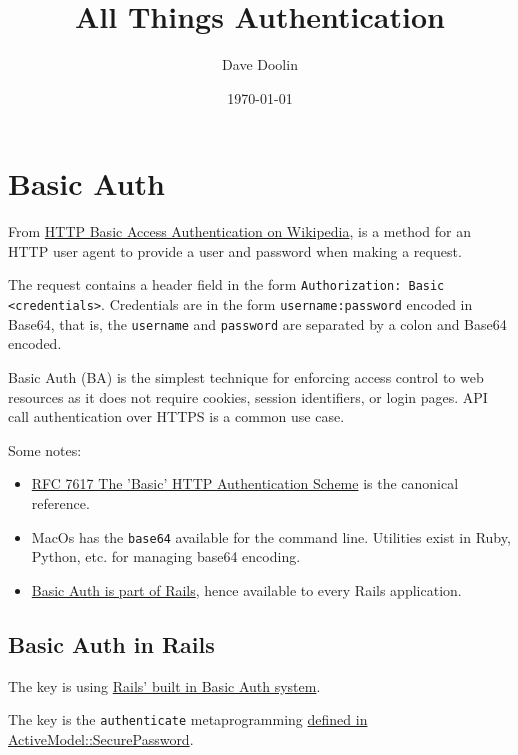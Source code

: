 \documentclass{article}
\title{All Things Authentication}
\date{\today}
\author{Dave Doolin}
\begin{document}
\maketitle

\tableofcontents




\section{Basic Auth}

From \href{https://en.wikipedia.org/wiki/Basic_access_authentication}{%
  HTTP Basic Access Authentication on Wikipedia}, is a method for an HTTP
user agent to provide a user and password when making a request.

The request contains a header field in the form \texttt{Authorization: Basic
 <credentials>}. Credentials are in the form \texttt{username:password} encoded in
Base64, that is, the \texttt{username} and \texttt{password} are separated by a colon
and Base64 encoded.

Basic Auth (BA) is the simplest technique for enforcing access control to
web resources as it does not require cookies, session identifiers, or
login pages. API call authentication over HTTPS is a common use case.

Some notes:
\begin{itemize}
  \item \href{https://tools.ietf.org/html/rfc7617}{%
      RFC 7617 The 'Basic' HTTP Authentication Scheme} is the
    canonical reference.
  \item MacOs has the \texttt{base64} available for the command line. Utilities
    exist in Ruby, Python, etc. for managing base64 encoding.
  \item \href{https://api.rubyonrails.org/classes/ActionController/HttpAuthentication/Basic.html}{%
      Basic Auth is part of Rails}, hence available to every Rails application.
\end{itemize}

\subsection{Basic Auth in Rails}

The key is using \href{https://github.com/rails/rails/blob/master/actionpack/lib/action_controller/metal/http_authentication.rb}{%
Rails' built in Basic Auth system}.

The key is the \texttt{authenticate} metaprogramming
\href{https://github.com/rails/rails/blob/master/activemodel/lib/active_model/secure_password.rb#L119}{%
  defined in ActiveModel::SecurePassword}.
\end{document}
